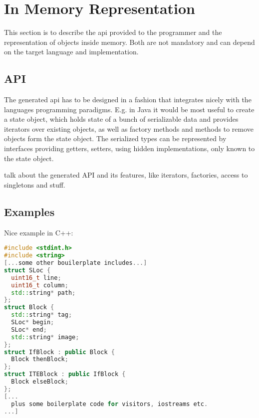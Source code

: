 \section{In Memory Representation}
This section is to describe the \gls{api} provided to the programmer and the representation of objects inside memory. Both are not mandatory and can depend on the target language and implementation.


\subsection{API}

The generated \gls{api} has to be designed in a fashion that integrates nicely with the languages programming paradigms. E.g. in Java it would be most useful to create a state object, which holds state of a bunch of serializable data and provides iterators over existing objects, as well as factory methods and methods to remove objects form the state object. The serialized types can be represented by interfaces providing getters, setters, using hidden implementations, only known to the state object.

talk about the generated API and its features, like iterators, factories, access to singletons and stuff.

\subsection*{Examples}

Nice example in C++:
\begin{lstlisting}[label=cppExample,caption=C++ Examples,language=C++]
#include <stdint.h>
#include <string>
[...some other bouilerplate includes...]
struct SLoc {
  uint16_t line;
  uint16_t column;
  std::string* path;
};
struct Block {
  std::string* tag;
  SLoc* begin;
  SLoc* end;
  std::string* image;
};
struct IfBlock : public Block {
  Block thenBlock;
};
struct ITEBlock : public IfBlock {
  Block elseBlock;
};
[...
  plus some boilerplate code for visitors, iostreams etc.
...]
\end{lstlisting}

